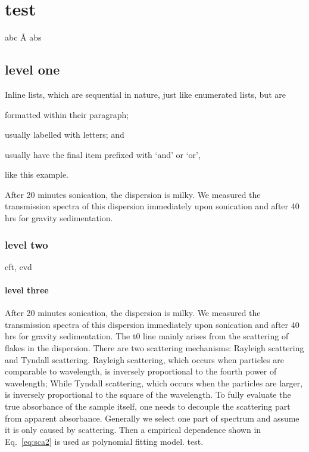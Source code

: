 
\chapter{test}
abc \si{\angstrom} abs

\section{level one}
Inline lists, which are sequential in nature, just like enumerated lists, but are
\begin{enumerate*}[label=\itshape\alph*\upshape)]
\item formatted within their paragraph;
\item usually labelled with letters; and
\item usually have the final item prefixed with `and' or `or',
\end{enumerate*} like this example.

\begin{hypothesis}
After 20 minutes sonication, the dispersion is milky. We measured the transmission spectra of this dispersion immediately upon sonication and after 40 hrs for gravity sedimentation.
\end{hypothesis}
\subsection{level two }
\Gls{cft}, \gls{cvd}
\subsubsection{level three}
After 20 minutes sonication, the dispersion is milky. We measured the transmission spectra of this dispersion immediately upon sonication and after 40 hrs for gravity sedimentation. The t0 line mainly arises from the scattering of flakes in the dispersion. There are two scattering mechanisms: Rayleigh scattering and Tyndall scattering. Rayleigh scattering, which occurs when particles are comparable to wavelength, is inversely proportional to the fourth power of wavelength; While Tyndall scattering, which occurs when the particles are larger, is inversely proportional to the square of the wavelength. To fully evaluate the true absorbance of the sample itself, one needs to decouple the scattering part from apparent absorbance. Generally we select one part of spectrum and assume it is only caused by scattering. Then a empirical dependence shown in Eq.~\ref{eq:sca2} is used as polynomial fitting model. test.

